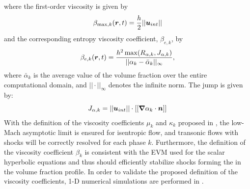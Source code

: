 %
where the first-order viscosity is given by
\begin{equation}\label{eq:first-order-beta-max-sct4-sem}
\beta_{\max,k} (\boldsymbol r,t) = \frac{h}{2} ||\boldsymbol u_{int}||
\end{equation}
%
and the corresponding entropy viscosity coefficient, $\beta_{e,k}$, by 
%
\begin{equation}
\beta_{e,k}(\boldsymbol r,t) = \frac{h^2 \max(R_{\alpha,k}, J_{\alpha,k})}{|| \alpha_k - \bar{\alpha}_k ||_\infty},
\end{equation}
where $\bar{\alpha}_k$ is the average value of the volume fraction over the entire computational domain, and $|| \cdot ||_\infty$ denotes the infinite norm. The jump is given by:
%
\begin{equation}
J_{\alpha,k} = || \boldsymbol u_{int} || \cdot [[ \boldsymbol{\nabla} \alpha_k \cdot \boldsymbol n ]] 
\end{equation}
With the definition of the viscosity coefficients $\mu_k$ and $\kappa_k$ proposed in , the low-Mach asymptotic limit is ensured for isentropic flow, and transonic flows with shocks will be correctly resolved for each phase $k$. Furthermore, the definition of the viscosity coefficient $\beta_k$ is consistent with the EVM used for the scalar hyperbolic equations and thus should efficiently stabilize shocks forming the in the volume fraction profile. In order to validate the proposed definition of the viscosity coefficients, 1-D numerical simulations are performed in .
%
